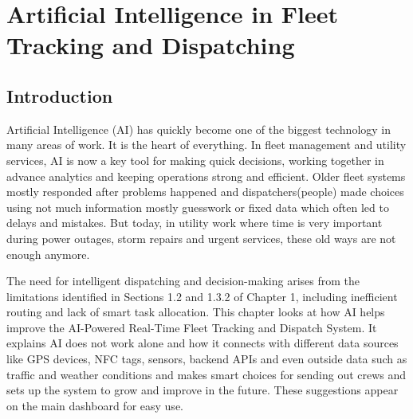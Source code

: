 

\maketitle

\chapter{Artificial Intelligence in Fleet Tracking and Dispatching}

\section{Introduction}
Artificial Intelligence (AI) has quickly become one of the biggest technology in many areas of work. It is the heart of everything. In fleet management and utility services, AI is now a key tool for making quick decisions, working together in advance analytics and keeping operations strong and efficient. Older fleet systems mostly responded after problems happened and dispatchers(people) made choices using not much information mostly guesswork or fixed data which often led to delays and mistakes. But today, in utility work where time is very important during power outages, storm repairs and urgent services, these old ways are not enough anymore.

The need for intelligent dispatching and decision-making arises from the limitations identified in Sections 1.2 and 1.3.2 of Chapter 1, including inefficient routing and lack of smart task allocation. This chapter looks at how AI helps improve the AI-Powered Real-Time Fleet Tracking and Dispatch System. It explains AI does not work alone and how it connects with different data sources like GPS devices, NFC tags, sensors, backend APIs and even outside data such as traffic and weather conditions and makes smart choices for sending out crews and sets up the system to grow and improve in the future. These suggestions appear on the main dashboard for easy use.

